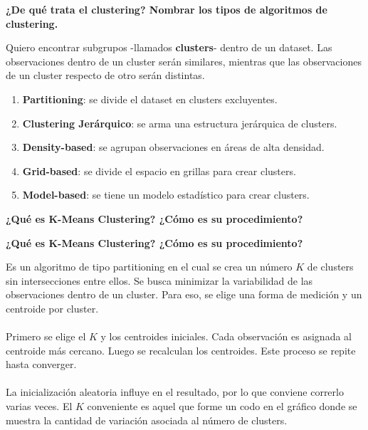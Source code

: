 \documentclass[10pt]{memoir}
\begin{document}
\clearpage
\begin{center}
	\textbf{\Large ¿De qué trata el clustering? Nombrar los tipos de algoritmos de clustering.} \\
\end{center}
\noindent Quiero encontrar subgrupos -llamados \textbf{clusters}- dentro de un dataset. Las observaciones dentro de un cluster serán similares, mientras que las observaciones de un cluster respecto de otro serán distintas.
\begin{enumerate}
	\item \textbf{Partitioning}: se divide el dataset en clusters excluyentes.
	\item \textbf{Clustering Jerárquico}: se arma una estructura jerárquica de clusters.
	\item \textbf{Density-based}: se agrupan observaciones en áreas de alta densidad.
	\item \textbf{Grid-based}: se divide el espacio en grillas para crear clusters.
	\item \textbf{Model-based}: se tiene un modelo estadístico para crear clusters.
\end{enumerate}

\clearpage
\begin{center}
	\textbf{\Large ¿Qué es K-Means Clustering? ¿Cómo es su procedimiento?} \\
\end{center}

\clearpage
\begin{center}
	\textbf{\Large ¿Qué es K-Means Clustering? ¿Cómo es su procedimiento?} \\
\end{center}
\noindent Es un algoritmo de tipo partitioning en el cual se crea un número $K$ de clusters sin intersecciones entre ellos. Se busca minimizar la variabilidad de las observaciones dentro de un cluster. Para eso, se elige una forma de medición y un centroide por cluster. \\
\\
\noindent Primero se elige el $K$ y los centroides iniciales. Cada observación es asignada al centroide más cercano. Luego se recalculan los centroides. Este proceso se repite hasta converger. \\
\\
\noindent La inicialización aleatoria influye en el resultado, por lo que conviene correrlo varias veces. El $K$ conveniente es aquel que forme un codo en el gráfico donde se muestra la cantidad de variación asociada al número de clusters.
\end{document}
